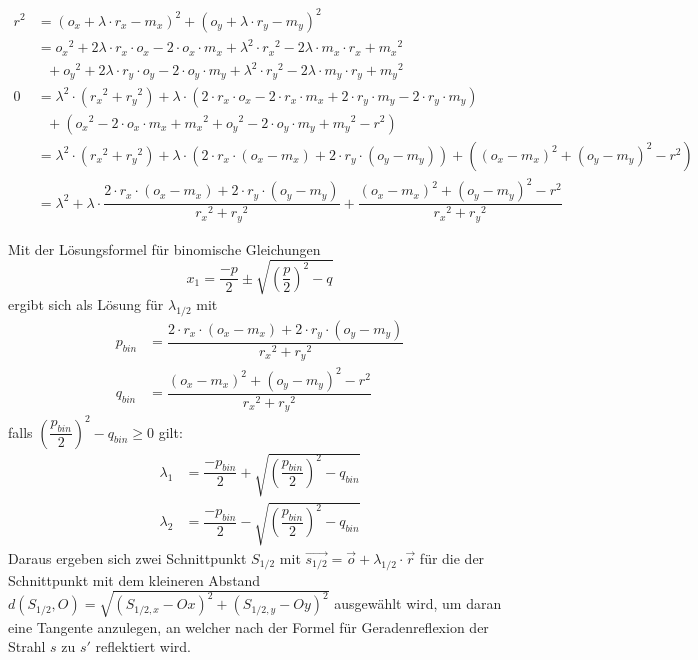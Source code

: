 \documentclass[reducespace,stylepage,semiarbeit]{spezidoc}
\begin{document}
\begin{equation*}
\begin{split}
r^2 &= {(o_x + \lambda \cdot r_x - m_x)}^2 + {(o_y + \lambda \cdot r_y - m_y)}^2 \\
 &= {o_x}^2 + 2\lambda\cdot r_x \cdot o_x - 2 \cdot o_x \cdot m_x + \lambda^2 \cdot {r_x}^2 - 2\lambda \cdot m_x \cdot r_x + {m_x}^2 \\
 & ~~~+{o_y}^2 + 2\lambda\cdot r_y \cdot o_y - 2 \cdot o_y \cdot m_y + \lambda^2 \cdot {r_y}^2 - 2\lambda \cdot m_y \cdot r_y + {m_y}^2 \\
0 &= \lambda^2 \cdot ({r_x}^2 + {r_y}^2) + \lambda \cdot (2 \cdot r_x \cdot o_x - 2 \cdot r_x \cdot m_x + 2 \cdot r_y \cdot m_y - 2 \cdot r_y \cdot m_y) \\
 & ~~~+({o_x}^2 - 2 \cdot o_x \cdot m_x + {m_x}^2 + {o_y}^2 - 2 \cdot o_y \cdot m_y + {m_y}^2 - r^2) \\
 &= \lambda^2 \cdot ({r_x}^2 + {r_y}^2) + \lambda \cdot (2 \cdot r_x \cdot (o_x - m_x) + 2 \cdot r_y \cdot (o_y - m_y)) + ({(o_x - m_x)}^2 + {(o_y - m_y)}^2 - r^2) \\
 &= \lambda^2 + \lambda \cdot \dfrac{2 \cdot r_x \cdot (o_x - m_x) + 2 \cdot r_y \cdot (o_y - m_y)}{{r_x}^2 + {r_y}^2} + \dfrac{{(o_x - m_x)}^2 + {(o_y - m_y)}^2 - r^2}{{r_x}^2 + {r_y}^2}
\end{split}
\end{equation*}

Mit der Lösungsformel für binomische Gleichungen 
\begin{equation*}
x_1 = \dfrac{-p}{2} \pm \sqrt{{(\dfrac{p}{2})}^2 - q}
\end{equation*}
ergibt sich als Lösung für $\lambda_{1/2}$ mit
\begin{equation*}
\begin{split}
p_{bin} &= \dfrac{2 \cdot r_x \cdot (o_x - m_x) + 2 \cdot r_y \cdot (o_y - m_y)}{{r_x}^2 + {r_y}^2} \\
q_{bin} &= \dfrac{{(o_x - m_x)}^2 + {(o_y - m_y)}^2 - r^2}{{r_x}^2 + {r_y}^2}
\end{split}
\end{equation*}
falls ${(\dfrac{p_{bin}}{2})}^2 - q_{bin} \geq 0$ gilt:
\begin{equation*}
\begin{split}
\lambda_1 &= \dfrac{-p_{bin}}{2} + \sqrt{{(\dfrac{p_{bin}}{2})}^2 - q_{bin}} \\
\lambda_2 &= \dfrac{-p_{bin}}{2} - \sqrt{{(\dfrac{p_{bin}}{2})}^2 - q_{bin}}
\end{split}
\end{equation*}
Daraus ergeben sich zwei Schnittpunkt $S_{1/2}$ mit $\vec{s_{1/2}} = \vec{o} + \lambda_{1/2} \cdot \vec{r}$ für die der Schnittpunkt mit dem kleineren Abstand $d(S_{1/2}, O) = \sqrt{{(S_{1/2, x} - Ox)}^2 + {(S_{1/2, y} - Oy)}^2}$ ausgewählt wird, um daran eine Tangente anzulegen, an welcher nach der Formel für Geradenreflexion der Strahl $s$ zu $s'$ reflektiert wird.
\end{document}

